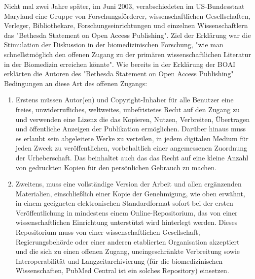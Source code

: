 Nicht mal zwei Jahre später, im Juni 2003, verabschiedeten im US-Bundesstaat Maryland eine Gruppe von Forschungsförderer, wissenschaftlichen Gesellschaften, Verleger, Bibliothekare, Forschungseinrichtungen und einzelnen Wissenschaftlern das "Bethesda Statement on Open Access Publishing".\cite{suchen} Ziel der Erklärung war die Stimulation der Diskussion in der biomedizinischen Forschung, "wie man schnellstmöglich den offenen Zugang zu der primären wissenschaftlichen Literatur in der Biomedizin erreichen könnte"\cite{suchen}. Wie bereits in der Erklärung der BOAI erklärten die Autoren des "Bethesda Statement on Open Access Publishing" Bedingungen an diese Art des offenen Zugangs\cite{suchen}:
\begin{enumerate}
\item Erstens müssen Autor(en) und Copyright-Inhaber für alle Benutzer eine freies, unwiderrufliches, weltweites, unbefristetes Recht auf den Zugang zu und verwenden eine Lizenz die das Kopieren, Nutzen, Verbreiten, Übertragen und öffentliche Anzeigen der Publikation ermöglichen. Darüber hinaus muss es erlaubt sein abgeleitete Werke zu verteilen, in jedem digitalen Medium für jeden Zweck zu veröffentlichen, vorbehaltlich einer angemessenen Zuordnung der Urheberschaft. Das beinhaltet auch das das Recht auf eine kleine Anzahl von gedruckten Kopien für den persönlichen Gebrauch zu machen. 
\item Zweitens, muss eine vollständige Version der Arbeit und allen ergänzenden Materialien, einschließlich einer Kopie der Genehmigung, wie oben erwähnt, in einem geeigneten elektronischen Standardformat sofort bei der ersten Veröffentlichung in mindestens einem Online-Repositorium, das von einer wissenschaftlichen Einrichtung unterstützt wird hinterlegt werden. Dieses Repositorium muss von einer wissenschaftlichen Gesellschaft, Regierungsbehörde oder einer anderen etablierten Organisation akzeptiert und die sich zu einen offenen Zugang, uneingeschränkte Verbreitung sowie Interoperabilität und Langzeitarchivierung (für die biomedizinischen Wissenschaften, PubMed Central ist ein solches Repository) einsetzen.
\end{enumerate}

